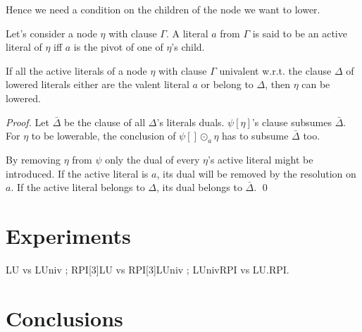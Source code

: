 \documentclass{llncs}
\newenvironment{jogo}{\color{teal}}{}
\begin{document}
Hence we need a condition on the children of the node we want to lower.

\begin{definition}
Let's consider a node $\eta$ with clause $\Gamma$. A literal $a$ from
$\Gamma$ is said to be an active literal of $\eta$ iff $a$ is the pivot of
one of $\eta$'s child.
\end{definition}

\begin{theorem}
If all the active literals of a node $\eta$ with clause $\Gamma$ univalent
w.r.t. the clause $\Delta$ of lowered literals either are the valent
literal $a$ or belong to $\Delta$, then $\eta$ can be lowered.
\end{theorem}

\begin{proof}
Let $\bar{\Delta}$ be the clause of all $\Delta$'s literals duals.
$\psi[\eta]$'s clause subsumes $\bar{\Delta}$. For $\eta$ to be lowerable,
the conclusion of $\psi[] \odot_a \eta$ has to subsume $\bar{\Delta}$ too.

By removing $\eta$ from $\psi$ only the dual of every $\eta$'s active literal
might be introduced. If the active literal is $a$, its dual will be removed
by the resolution on $a$. If the active literal belongs to $\Delta$, its
dual belongs to $\bar{\Delta}$.
\qed
\end{proof}

\section{Experiments}

\begin{jogo}
LU vs LUniv ; RPI[3]LU vs RPI[3]LUniv ; LUnivRPI vs LU.RPI.
\end{jogo}

\section{Conclusions}



\end{document}
